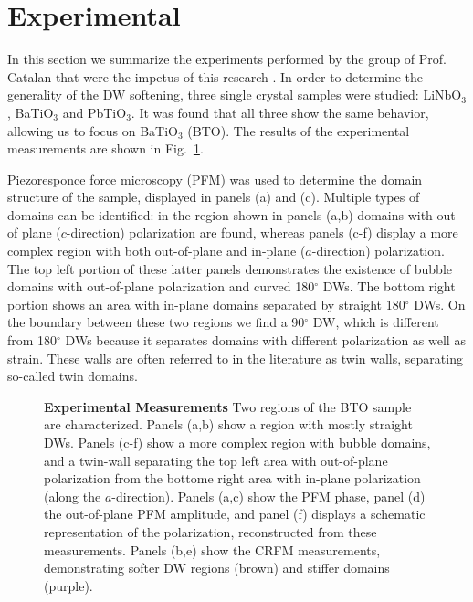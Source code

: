 \section{Experimental}
In this section we summarize the experiments performed by the group of Prof. Catalan that were the impetus of this research \cite{Stefani2020}.
In order to determine the generality of the DW softening, three single crystal samples were studied: LiNbO$_3$, BaTiO$_3$ and PbTiO$_3$. It was found that all three show the same behavior, allowing us to focus on BaTiO$_3$ (BTO).
The results of the experimental measurements are shown in Fig.~\ref{fig:BTO_experiment}.

Piezoresponce force microscopy (PFM)\cite{Harnagea2001} was used to determine the domain structure of the sample, displayed in panels (a) and (c).
Multiple types of domains can be identified: in the region shown in panels (a,b) domains with out-of plane ($c$-direction) polarization are found, whereas panels (c-f) display a more complex region with both out-of-plane and in-plane ($a$-direction) polarization.
The top left portion of these latter panels demonstrates the existence of bubble domains with out-of-plane polarization and curved 180$^\circ$ DWs.
The bottom right portion shows an area with in-plane domains separated by straight 180$^\circ$ DWs.
On the boundary between these two regions we find a 90$^\circ$ DW, which is different from 180$^\circ$ DWs because it separates domains with different polarization as well as strain.
These walls are often referred to in the literature as twin walls, separating so-called twin domains. 

\begin{figure}
	\caption{\label{fig:BTO_experiment} {\bf Experimental Measurements} Two regions of the BTO sample are characterized. Panels (a,b) show a region with mostly straight DWs. Panels (c-f) show a more complex region with bubble domains, and a twin-wall separating the top left area with out-of-plane polarization from the bottome right area with in-plane polarization (along the $a$-direction). Panels (a,c) show the PFM phase, panel (d) the out-of-plane PFM amplitude, and panel (f) displays a schematic representation of the polarization, reconstructed from these measurements. Panels (b,e) show the CRFM measurements, demonstrating softer DW regions (brown) and stiffer domains (purple).}
\end{figure}

